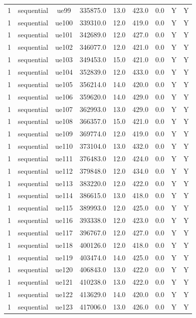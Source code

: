 \begin{table}[ht]
\begin{tabular}{|c|c|c|c|c|c|c|c|c|}
1 & sequential & ue99 & 335875.0 & 13.0 & 423.0 & 0.0 & Y & Y \\
1 & sequential & ue100 & 339310.0 & 12.0 & 419.0 & 0.0 & Y & Y \\
1 & sequential & ue101 & 342689.0 & 12.0 & 427.0 & 0.0 & Y & Y \\
1 & sequential & ue102 & 346077.0 & 12.0 & 421.0 & 0.0 & Y & Y \\
1 & sequential & ue103 & 349453.0 & 15.0 & 421.0 & 0.0 & Y & Y \\
1 & sequential & ue104 & 352839.0 & 12.0 & 433.0 & 0.0 & Y & Y \\
1 & sequential & ue105 & 356214.0 & 14.0 & 420.0 & 0.0 & Y & Y \\
1 & sequential & ue106 & 359620.0 & 14.0 & 429.0 & 0.0 & Y & Y \\
1 & sequential & ue107 & 362993.0 & 13.0 & 429.0 & 0.0 & Y & Y \\
1 & sequential & ue108 & 366357.0 & 15.0 & 421.0 & 0.0 & Y & Y \\
1 & sequential & ue109 & 369774.0 & 12.0 & 419.0 & 0.0 & Y & Y \\
1 & sequential & ue110 & 373104.0 & 13.0 & 432.0 & 0.0 & Y & Y \\
1 & sequential & ue111 & 376483.0 & 12.0 & 424.0 & 0.0 & Y & Y \\
1 & sequential & ue112 & 379848.0 & 12.0 & 434.0 & 0.0 & Y & Y \\
1 & sequential & ue113 & 383220.0 & 12.0 & 422.0 & 0.0 & Y & Y \\
1 & sequential & ue114 & 386615.0 & 13.0 & 418.0 & 0.0 & Y & Y \\
1 & sequential & ue115 & 389993.0 & 12.0 & 425.0 & 0.0 & Y & Y \\
1 & sequential & ue116 & 393338.0 & 12.0 & 423.0 & 0.0 & Y & Y \\
1 & sequential & ue117 & 396767.0 & 12.0 & 427.0 & 0.0 & Y & Y \\
1 & sequential & ue118 & 400126.0 & 12.0 & 418.0 & 0.0 & Y & Y \\
1 & sequential & ue119 & 403474.0 & 14.0 & 425.0 & 0.0 & Y & Y \\
1 & sequential & ue120 & 406843.0 & 13.0 & 422.0 & 0.0 & Y & Y \\
1 & sequential & ue121 & 410238.0 & 13.0 & 422.0 & 0.0 & Y & Y \\
1 & sequential & ue122 & 413629.0 & 14.0 & 420.0 & 0.0 & Y & Y \\
1 & sequential & ue123 & 417006.0 & 13.0 & 426.0 & 0.0 & Y & Y \\

\end{tabular}
\end{table}
